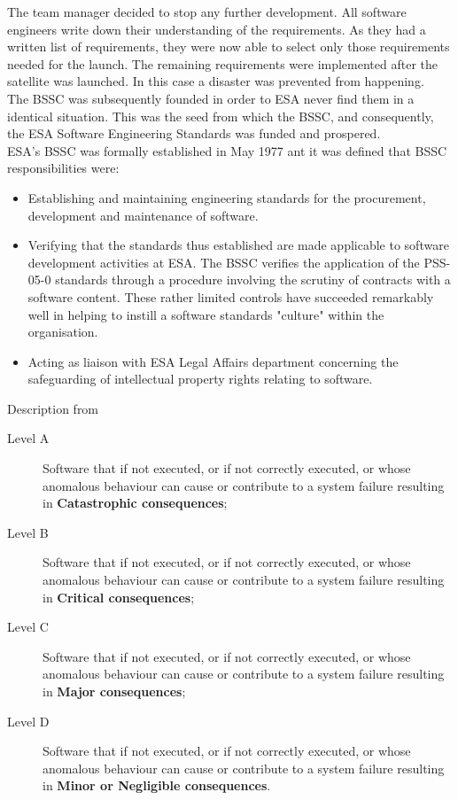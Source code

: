 {The team manager decided to stop any further development. All software engineers write down their understanding of the requirements.
As they had a written list of requirements, they were now able to select only
those requirements needed for the launch. The remaining requirements were implemented after
the satellite was launched. In this case a disaster was prevented from happening\cite{Zwartjes05anagile}.\\
The \ac{BSSC} was subsequently founded in order to \ac{ESA} never find them in a identical situation. This was the seed from
which the \ac{BSSC}, and consequently, the \ac{ESA} Software Engineering Standards was funded and prospered.\\
\ac{ESA}'s \ac{BSSC} was formally established in May 1977 ant it was defined that \ac{BSSC} responsibilities were:
\begin{itemize}
\item Establishing and maintaining engineering standards for the procurement,
development and maintenance of software.
\item Verifying that the standards thus established are made applicable to software
development activities at \ac{ESA}. The \ac{BSSC} verifies the application of the PSS-05-0\cite{pss-05-0} standards through a procedure involving the
scrutiny of contracts with a software content.
These rather limited controls have succeeded remarkably well in helping to instill a software standards "culture" within the organisation.
\item Acting as liaison with \ac{ESA} Legal Affairs department concerning the safeguarding of intellectual
property rights relating to software.
\end{itemize}

Description from\cite{ecss-q-st-80c}
\begin{description}
\item[Level A] Software that if not executed, or if not correctly executed, or whose anomalous behaviour can cause or contribute to a system failure resulting in \textbf{Catastrophic consequences};
\item[Level B] Software that if not executed, or if not correctly executed, or whose anomalous behaviour can cause or contribute to a system failure resulting in \textbf{Critical consequences};
\item[Level C] Software that if not executed, or if not correctly executed, or whose anomalous behaviour can cause or contribute to a system failure resulting in \textbf{Major consequences};
\item[Level D] Software that if not executed, or if not correctly executed, or whose anomalous behaviour can cause or contribute to a system failure resulting in \textbf{Minor or Negligible consequences}.
\end{description}

}
